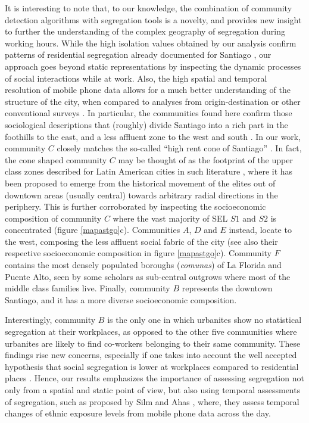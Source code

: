 \documentclass[%
preprint,
 amsmath,amssymb,
pra,
]{revtex4-1}
\begin{document}
It is interesting to note that, to our knowledge, the combination  of community detection algorithms with segregation tools is a novelty, and provides new insight to further the understanding of the complex geography of segregation during working hours. While the high isolation values obtained by our analysis confirm patterns of residential segregation already documented for Santiago \cite{caceres2017peri, agostini2016segregacion, Garreton2017}, our approach goes beyond static representations by inspecting the dynamic processes of social interactions while at work. Also, the high spatial and temporal resolution of mobile phone data allows for a much better understanding of the structure of the city, when compared to analyses from origin-destination or other conventional surveys \cite{lotero2016rich, fuentes2017santiago, farber2015measuring, wong2011measuring}. In particular, the communities found here confirm those sociological descriptions that (roughly) divide Santiago into a rich part in the foothills to the east, and a less affluent zone to the west and south \cite{caceres2017peri,agostini2016segregacion}. In our work, community $C$ closely matches the so-called ``high rent cone of Santiago'' \cite{link2015segregacion}. In fact,  the cone shaped community $C$ may be thought of as the footprint of the upper class zones described for Latin American cities in such literature \cite{sabatini2001segregacion}, where it has been proposed to emerge from the historical movement of the elites out of downtown areas (usually central) towards arbitrary radial directions in the periphery. This is further corroborated by inspecting the socioeconomic composition of community $C$ where the vast majority of SEL $S1$ and $S2$ is concentrated (figure \ref{mapastgo}c). Communities $A$, $D$ and $E$ instead, locate to the west, composing the less affluent social fabric of the city (see also their respective socioeconomic composition in figure \ref{mapastgo}c). Community $F$ contains the most densely populated boroughs (\emph{comunas}) of La Florida and Puente Alto, seen by some scholars as sub-central outgrows \cite{truffello2015policentrismo} where most of the middle class families live.  Finally, community $B$ represents the downtown Santiago, and it has a more diverse socioeconomic composition. 

Interestingly, community $B$ is the only one in which urbanites show no statistical segregation at their workplaces, as opposed to the other five communities where urbanites are likely to find co-workers belonging to their same community. These findings rise new concerns, especially if one takes into account the well accepted hypothesis that social segregation is lower at workplaces compared to residential places \cite{schnell2001sociospatial, ellis2004work, silm2014temporal}. Hence, our results emphasizes the importance of assessing segregation not only from a spatial and static point of view, but also using temporal assessments of segregation, such as proposed by Silm and Ahas \cite{silm2014temporal}, where, they assess temporal changes of ethnic exposure levels from mobile phone data across the day.
\end{document}
